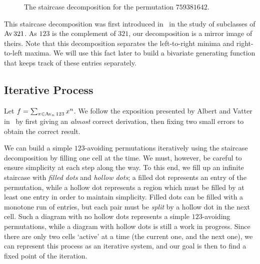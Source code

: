     \begin{figure}[t] \centering
    \caption{The staircase decomposition for the permutation $759381642$.}
    \label{involutions:fig:staircase}
    \end{figure}

    This staircase decomposition was first introduced in~\cite{Albert2010} in
    the study of subclasses of $\operatorname{{Av}} 321$. As $123$ is the complement of $321$,
    our decomposition is a mirror image of theirs. Note that this decomposition
    separates the left-to-right minima and right-to-left maxima. We will use
    this fact later to build a bivariate generating function that keeps track
    of these entries separately. 

  \subsection{Iterative Process}

    Let $f = \sum_{\pi \in \operatorname{{Av}}_n 123} x^{n}$. We follow the exposition
    presented by Albert and Vatter in~\cite{Vatter2013} by first giving an
    \emph{almost} correct derivation, then fixing two small errors to obtain
    the correct result. 

    We can build a simple $123$-avoiding permutations iteratively using the
    staircase decomposition by filling one cell at the time. We must, however,
    be careful to ensure simplicity at each step along the way. To this end, we
    fill up an infinite staircase with \emph{filled dots} and \emph{hollow
    dots}; a filled dot represents an entry of the permutation, while a hollow
    dot represents a region which must be filled by at least one entry in order
    to maintain simplicity. Filled dots can be filled with a monotone run of
    entries, but each pair must be \emph{split} by a hollow dot in the next
    cell. Such a diagram with no hollow dots represents a simple $123$-avoiding
    permutations, while a diagram with hollow dots is still a work in progress.
    Since there are only two cells `active' at a time (the current one, and the
    next one), we can represent this process as an iterative system, and our
    goal is then to find a fixed point of the iteration. 

